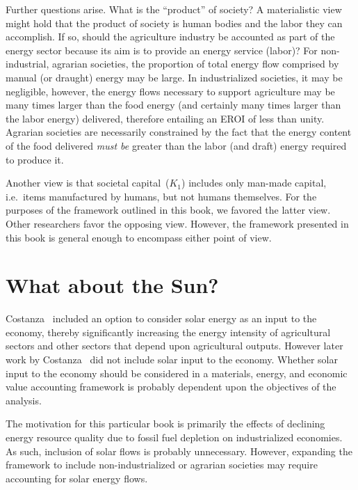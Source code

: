 Further questions arise. 
What is the ``product'' of society? 
A materialistic view might hold that the product of
society is human bodies and the labor they can accomplish. 
If so, 
should the agriculture industry 
be accounted as part of the energy sector 
because its aim is to provide 
an energy service (labor)? 
For non-industrial, agrarian societies, 
the proportion of total energy flow 
comprised by manual (or draught) energy 
may be large. 
In industrialized societies, 
it may be negligible, 
however, 
the energy flows necessary to support agriculture
may be many times larger than the food energy
(and certainly many times larger 
than the labor energy) 
delivered, therefore entailing an EROI of less than unity. 
Agrarian societies are necessarily constrained 
by the fact that the energy content of the food delivered 
\emph{must be} greater than the labor (and draft) 
energy required to produce it.

Another view is that societal capital~($K_{1}$) 
includes only man-made capital, 
i.e.\ items manufactured by humans,
but not humans themselves. 
For the purposes of the framework outlined in this book, 
we favored the latter view.
Other researchers favor the opposing view.\cite{Giampietro2013}
However,
the framework presented in this book is general enough to encompass either point of view.


\section{What about the Sun?}
\label{sec:emergy}

Costanza~\cite{Costanza:1978vd} included an option to consider 
solar energy as an input to the economy, 
thereby significantly increasing the energy intensity 
of agricultural sectors and other sectors 
that depend upon agricultural outputs. 
However later work by Costanza~\cite{Costanza:1984tq,Costanza:1980ww} 
did not include solar input to the economy.
Whether solar input to the economy 
should be considered in a materials, energy, and economic value 
accounting framework is probably dependent upon 
the objectives of the analysis. 

The motivation for this particular book is primarily 
the effects of declining energy resource quality
due to fossil fuel depletion on industrialized economies. 
As such, inclusion of solar flows is probably unnecessary. 
However, expanding the framework to include non-industrialized 
or agrarian societies may require accounting for solar energy flows. 

